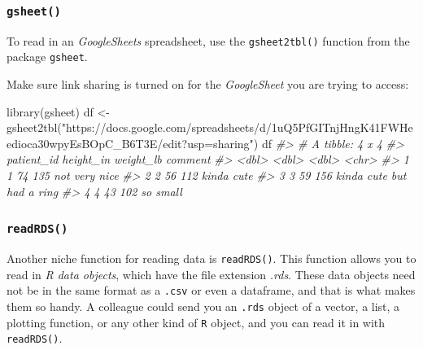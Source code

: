 \documentclass[
]{book}
\newenvironment{Shaded}{\begin{snugshade}}{\end{snugshade}}
\newcommand{\CommentTok}[1]{\textcolor[rgb]{0.56,0.35,0.01}{\textit{#1}}}
\newcommand{\FunctionTok}[1]{\textcolor[rgb]{0.00,0.00,0.00}{#1}}
\newcommand{\NormalTok}[1]{#1}
\newcommand{\OtherTok}[1]{\textcolor[rgb]{0.56,0.35,0.01}{#1}}
\newcommand{\StringTok}[1]{\textcolor[rgb]{0.31,0.60,0.02}{#1}}
\begin{document}
\hypertarget{gsheet}{%
\subsubsection*{\texorpdfstring{\texttt{gsheet()}}{gsheet()}}\label{gsheet}}

To read in an \emph{GoogleSheets} spreadsheet, use the \texttt{gsheet2tbl()} function from the package \texttt{gsheet}.

Make sure link sharing is turned on for the \emph{GoogleSheet} you are trying to access:

\begin{Shaded}
\begin{Highlighting}[]
\FunctionTok{library}\NormalTok{(gsheet)}
\NormalTok{df }\OtherTok{\textless{}{-}} \FunctionTok{gsheet2tbl}\NormalTok{(}\StringTok{"https://docs.google.com/spreadsheets/d/1uQ5PfGITnjHngK41FWHeedioca30wpyEsBOpC\_B6T3E/edit?usp=sharing"}\NormalTok{)}
\NormalTok{df}
\CommentTok{\#\textgreater{} \# A tibble: 4 x 4}
\CommentTok{\#\textgreater{}   patient\_id height\_in weight\_lb comment                  }
\CommentTok{\#\textgreater{}        \textless{}dbl\textgreater{}     \textless{}dbl\textgreater{}     \textless{}dbl\textgreater{} \textless{}chr\textgreater{}                    }
\CommentTok{\#\textgreater{} 1          1        74       135 not very nice            }
\CommentTok{\#\textgreater{} 2          2        56       112 kinda cute               }
\CommentTok{\#\textgreater{} 3          3        59       156 kinda cute but had a ring}
\CommentTok{\#\textgreater{} 4          4        43       102 so small}
\end{Highlighting}
\end{Shaded}

\hypertarget{readrds}{%
\subsubsection*{\texorpdfstring{\texttt{readRDS()}}{readRDS()}}\label{readrds}}

Another niche function for reading data is \texttt{readRDS()}. This function allows you to read in \emph{R data objects}, which have the file extension \emph{.rds}. These data objects need not be in the same format as a \texttt{.csv} or even a dataframe, and that is what makes them so handy. A colleague could send you an \texttt{.rds} object of a vector, a list, a plotting function, or any other kind of \texttt{R} object, and you can read it in with \texttt{readRDS()}.
\end{document}
